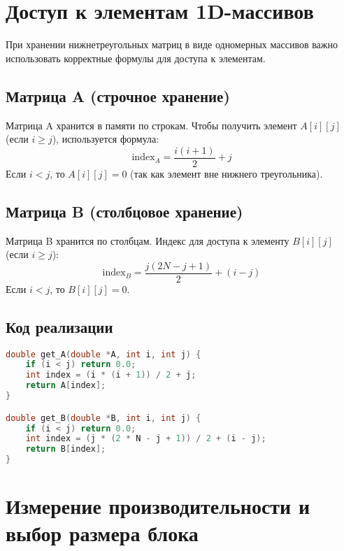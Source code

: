\documentclass[14pt, russian]{matmex-diploma-custom}
\begin{document}
\section*{Доступ к элементам 1D-массивов}

При хранении нижнетреугольных матриц в виде одномерных массивов важно использовать корректные формулы для доступа к элементам.

\subsection*{Матрица A (строчное хранение)}

Матрица A хранится в памяти по строкам. Чтобы получить элемент $A[i][j]$ (если $i \geq j$), используется формула:
\begin{equation}
\text{index}_A = \frac{i(i+1)}{2} + j
\end{equation}
Если $i < j$, то $A[i][j] = 0$ (так как элемент вне нижнего треугольника).

\subsection*{Матрица B (столбцовое хранение)}

Матрица B хранится по столбцам. Индекс для доступа к элементу $B[i][j]$ (если $i \geq j$):
\begin{equation}
\text{index}_B = \frac{j(2N - j + 1)}{2} + (i - j)
\end{equation}
Если $i < j$, то $B[i][j] = 0$.

\subsection*{Код реализации}

{\footnotesize
\begin{lstlisting}[language=C, basicstyle=\ttfamily\footnotesize]
double get_A(double *A, int i, int j) {
    if (i < j) return 0.0;
    int index = (i * (i + 1)) / 2 + j;
    return A[index];
}

double get_B(double *B, int i, int j) {
    if (i < j) return 0.0;
    int index = (j * (2 * N - j + 1)) / 2 + (i - j);
    return B[index];
}
\end{lstlisting}
}

\section*{Измерение производительности и выбор размера блока}
\end{document}
